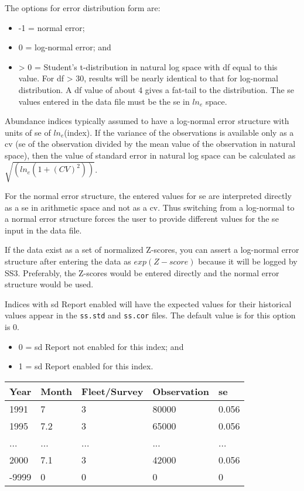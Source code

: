 The options for error distribution form are:
\begin{itemize}
	\item -1 = normal error;
	\item  0 = log-normal error; and 
	\item > 0 = Student's t-distribution in natural log space with \gls{df} equal to this value. For \gls{df} > 30, results will be nearly identical to that for log-normal distribution. A \gls{df} value of about 4 gives a fat-tail to the distribution. The \gls{se} values entered in the data file must be the \gls{se} in $ln_{e}$ space.
\end{itemize}

Abundance indices typically assumed to have a log-normal error structure with units of \gls{se} of $ln_{e}$(index). If the variance of the observations is available only as a \gls{cv} (\gls{se} of the observation divided by the mean value of the observation in natural space), then the value of standard error in natural log space can be calculated as $\sqrt{(ln_e(1+(CV)^2))}$.

For the normal error structure, the entered values for \gls{se} are interpreted directly as a \gls{se} in arithmetic space and not as a \gls{cv}. Thus switching from a log-normal to a normal error structure forces the user to provide different values for the \gls{se} input in the data file.

If the data exist as a set of normalized Z-scores, you can assert a log-normal error structure after entering the data as $exp(Z-score)$ because it will be logged by SS3. Preferably, the Z-scores would be entered directly and the normal error structure would be used.

Indices with \gls{sd} Report enabled will have the expected values for their historical values appear in the \texttt{ss.std} and \texttt{ss.cor} files. The default value is for this option is 0.

\begin{itemize}
	\item 0 = \gls{sd} Report not enabled for this index; and
	\item 1 = \gls{sd} Report enabled for this index.
\end{itemize}


\begin{center}
	\begin{tabular}{p{3cm} p{2cm} p{3cm} p{3cm} p{2.5cm}}
		\hline
		Year & Month & Fleet/Survey & Observation & \gls{se} \Tstrut\Bstrut\\
		\hline
		1991 & 7   & 3   & 80000 & 0.056 \Tstrut\\
		1995 & 7.2 & 3   & 65000 & 0.056 \\
		...  & ... & ... & ...   & ... \\
		2000 & 7.1 & 3   & 42000 & 0.056 \\
		-9999 & 0  & 0   & 0     & 0 \Bstrut\\ 
		\hline
	\end{tabular}
\end{center}

